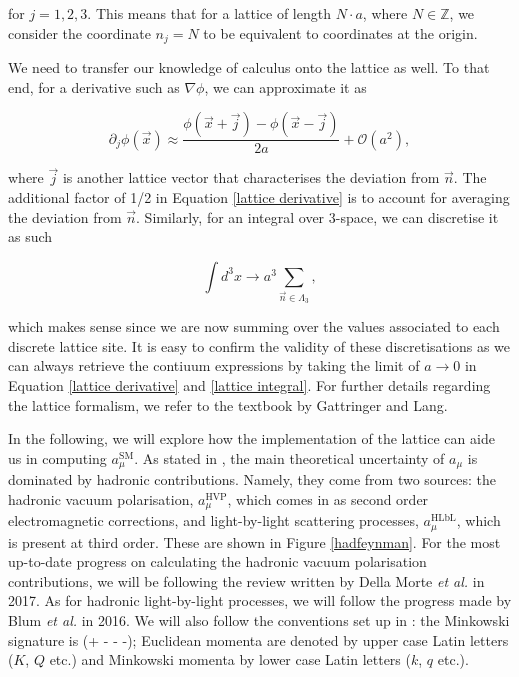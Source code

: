 \documentclass{article}
\numberwithin{equation}{section} %
\begin{document}
\noindent for $j=1,2,3$. This means that for a lattice of length $N\cdot a$, where $N\in\mathbb{Z}$, we consider the coordinate $n_j=N$ to be equivalent to coordinates at the origin.

We need to transfer our knowledge of calculus onto the lattice as well. To that end, for a derivative such as $\nabla\phi$, we can approximate it as

\begin{equation}
\partial_j\phi(\vec{x}) \approx \frac{\phi(\vec{x}+\vec{j})-\phi(\vec{x}-\vec{j})}{2a} + \mathcal{O}(a^2),
\label{lattice derivative}
\end{equation}

\noindent where $\vec{j}$ is another lattice vector that characterises the deviation from $\vec{n}$. The additional factor of 1/2 in Equation \ref{lattice derivative} is to account for averaging the deviation from $\vec{n}$. Similarly, for an integral over 3-space, we can discretise it as such

\begin{equation}
\int d^3x \rightarrow a^3\sum_{\vec{n}\in\Lambda_3},
\label{lattice integral}
\end{equation}

\noindent which makes sense since we are now summing over the values associated to each discrete lattice site. It is easy to confirm the validity of these discretisations as we can always retrieve the contiuum expressions by taking the limit of $a\rightarrow 0$ in Equation \ref{lattice derivative} and \ref{lattice integral}. For further details regarding the lattice formalism, we refer to the textbook by Gattringer and Lang\cite{lattice}.

In the following, we will explore how the implementation of the lattice can aide us in computing $a_\mu^\mathrm{SM}$. As stated in \cite{lehnerg2}, the main theoretical uncertainty of $a_\mu$ is dominated by hadronic contributions. Namely, they come from two sources: the hadronic vacuum polarisation, $a_\mu^\mathrm{HVP}$, which comes in as second order electromagnetic corrections, and light-by-light scattering  processes, $a_\mu^\mathrm{HLbL}$, which is present at third order. These are shown in Figure \ref{hadfeynman}. For the most up-to-date progress on calculating the hadronic vacuum polarisation contributions, we will be following the review written by Della Morte \textit{et al.}\cite{dellamorte} in 2017. As for hadronic light-by-light processes, we will follow the progress made by Blum \textit{et al.}\cite{blum} in 2016. We will also follow the conventions set up in \cite{vector}: the Minkowski signature is (+ - - -); Euclidean momenta are denoted by upper case Latin letters ($K$, $Q$ etc.) and Minkowski momenta by lower case Latin letters ($k$, $q$ etc.).
\end{document}
